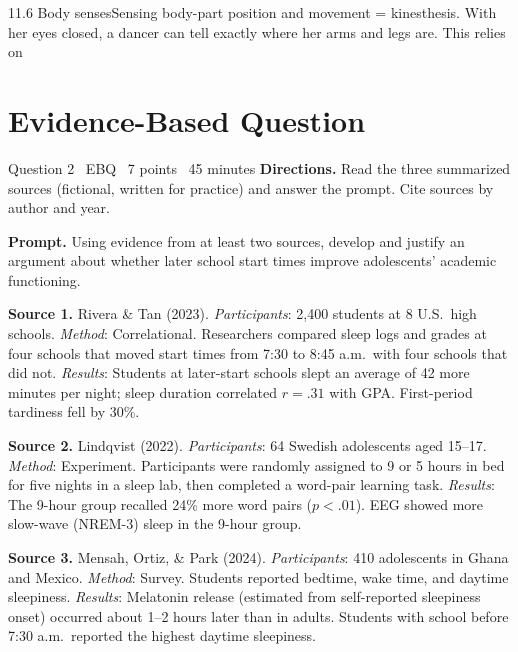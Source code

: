 \documentclass[11pt]{article}
\begin{document}
\begin{q}{1}{1.6 Body senses}{Sensing body-part position and movement = kinesthesis.}
With her eyes closed, a dancer can tell exactly where her arms and legs are. This relies on
\end{q}

\section{Evidence-Based Question}

\begin{frq}{Question 2 \textperiodcentered\ EBQ \textperiodcentered\ 7 points \textperiodcentered\ 45 minutes}
\small
\textbf{Directions.} Read the three summarized sources (fictional, written for practice) and answer the prompt. Cite sources by author and year.

\textbf{Prompt.} Using evidence from at least two sources, develop and justify an argument about whether later school start times improve adolescents' academic functioning.

\medskip
\textbf{Source 1.} Rivera \& Tan (2023). \emph{Participants}: 2{,}400 students at 8 U.S.\ high schools. \emph{Method}: Correlational. Researchers compared sleep logs and grades at four schools that moved start times from 7:30 to 8:45 a.m.\ with four schools that did not. \emph{Results}: Students at later-start schools slept an average of 42 more minutes per night; sleep duration correlated \(r = .31\) with GPA. First-period tardiness fell by 30\%.

\textbf{Source 2.} Lindqvist (2022). \emph{Participants}: 64 Swedish adolescents aged 15--17. \emph{Method}: Experiment. Participants were randomly assigned to 9 or 5 hours in bed for five nights in a sleep lab, then completed a word-pair learning task. \emph{Results}: The 9-hour group recalled 24\% more word pairs (\(p < .01\)). EEG showed more slow-wave (NREM-3) sleep in the 9-hour group.

\textbf{Source 3.} Mensah, Ortiz, \& Park (2024). \emph{Participants}: 410 adolescents in Ghana and Mexico. \emph{Method}: Survey. Students reported bedtime, wake time, and daytime sleepiness. \emph{Results}: Melatonin release (estimated from self-reported sleepiness onset) occurred about 1--2 hours later than in adults. Students with school before 7:30 a.m.\ reported the highest daytime sleepiness.


\end{frq}
\end{document}
